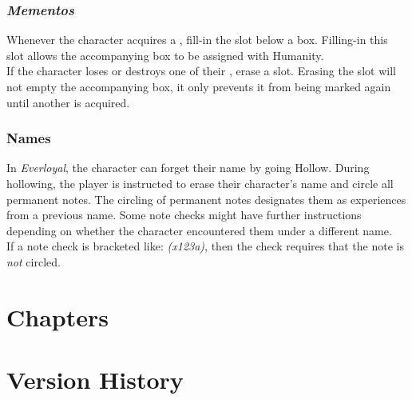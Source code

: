 \documentclass[12pt]{article}
\begin{document}
\begin{multicols*}{2}
\subsubsection{\emph{Mementos}}
\hypertarget{mementos}{}\hypertarget{memento}{}
Whenever the character acquires a , fill-in the  slot below a  box. Filling-in this slot allows the accompanying  box to be assigned with Humanity.\\
If the character loses or destroys one of their , erase a  slot. Erasing the  slot will not empty the accompanying  box, it only prevents it from being marked again until another  is acquired.

\subsubsection{Names}
In \emph{Everloyal}, the character can forget their name by going Hollow. During hollowing, the player is instructed to erase their character’s name and circle all permanent notes. The circling of permanent notes designates them as experiences from a previous name. Some note checks might have further instructions depending on whether the character encountered them under a different name.\\
If a note check is bracketed like: \emph{(x123a)}, then the check requires that the note is \emph{not} circled.

\end{multicols*}
\pagebreak



\section{Chapters}



\pagebreak

\renewcommand{\arraystretch}{1.5}



\pagebreak



\pagebreak



\pagebreak


\pagebreak

\section{Version History}
\end{document}
